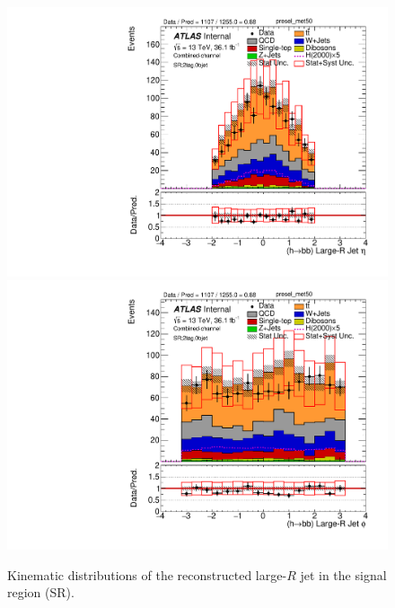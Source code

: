 \begin{figure}[!h]
\begin{center}
\includegraphics[scale=0.33]{./figures/boosted/PlotsInMbbSR/Unblinded/DataMC_2tag_0bjet_SR_lepton_presel_met50_HbbEta} 
\includegraphics[scale=0.33]{./figures/boosted/PlotsInMbbSR/Unblinded/DataMC_2tag_0bjet_SR_lepton_presel_met50_HbbPhi} 
\caption{Kinematic distributions of the reconstructed large-$R$ jet in the signal region (SR).}
\label{fig:boosted_SR_largerjet}
\end{center}
\end{figure}

